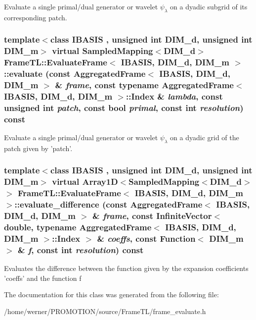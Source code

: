 Evaluate a single primal/dual generator or wavelet $\psi_\lambda$ on a dyadic subgrid of its corresponding patch. \hypertarget{classFrameTL_1_1EvaluateFrame_974094ff59dc684362f5237ea8813014}{
\subsubsection[{evaluate}]{\setlength{\rightskip}{0pt plus 5cm}template$<$class IBASIS , unsigned int DIM\_\-d, unsigned int DIM\_\-m$>$ virtual SampledMapping$<$DIM\_\-d$>$ {\bf FrameTL::EvaluateFrame}$<$ IBASIS, DIM\_\-d, DIM\_\-m $>$::evaluate (const {\bf AggregatedFrame}$<$ IBASIS, DIM\_\-d, DIM\_\-m $>$ \& {\em frame}, \/  const typename {\bf AggregatedFrame}$<$ IBASIS, DIM\_\-d, DIM\_\-m $>$::Index \& {\em lambda}, \/  const unsigned int {\em patch}, \/  const bool {\em primal}, \/  const int {\em resolution}) const}}
\label{classFrameTL_1_1EvaluateFrame_974094ff59dc684362f5237ea8813014}


Evaluate a single primal/dual generator or wavelet $\psi_\lambda$ on a dyadic grid of the patch given by 'patch'. \hypertarget{classFrameTL_1_1EvaluateFrame_c61439dafa2ec4fa0793589ee3a84751}{
\subsubsection[{evaluate\_\-difference}]{\setlength{\rightskip}{0pt plus 5cm}template$<$class IBASIS , unsigned int DIM\_\-d, unsigned int DIM\_\-m$>$ virtual Array1D$<$SampledMapping$<$DIM\_\-d$>$ $>$ {\bf FrameTL::EvaluateFrame}$<$ IBASIS, DIM\_\-d, DIM\_\-m $>$::evaluate\_\-difference (const {\bf AggregatedFrame}$<$ IBASIS, DIM\_\-d, DIM\_\-m $>$ \& {\em frame}, \/  const InfiniteVector$<$ double, typename {\bf AggregatedFrame}$<$ IBASIS, DIM\_\-d, DIM\_\-m $>$::Index $>$ \& {\em coeffs}, \/  const Function$<$ DIM\_\-m $>$ \& {\em f}, \/  const int {\em resolution}) const}}
\label{classFrameTL_1_1EvaluateFrame_c61439dafa2ec4fa0793589ee3a84751}


Evaluates the difference between the function given by the expansion coefficients 'coeffs' and the function f 

The documentation for this class was generated from the following file:\begin{CompactItemize}
\item 
/home/werner/PROMOTION/source/FrameTL/frame\_\-evaluate.h\end{CompactItemize}
